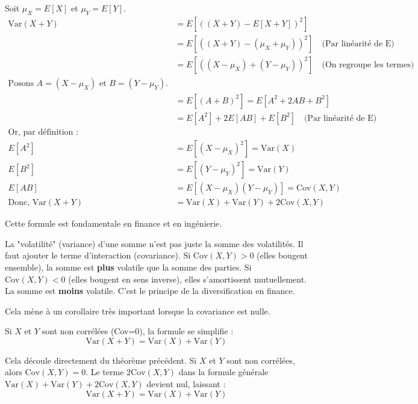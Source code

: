 \begin{proofbox}
Soit $\mu_X = E[X]$ et $\mu_Y = E[Y]$.
\begin{align*}
\text{Var}(X+Y) &= E\left[ ((X+Y) - E[X+Y])^2 \right] \\
&= E\left[ ((X+Y) - (\mu_X + \mu_Y))^2 \right] \quad \text{(Par linéarité de E)} \\
&= E\left[ ((X - \mu_X) + (Y - \mu_Y))^2 \right] \quad \text{(On regroupe les termes)} \\
\text{Posons } A = (X - \mu_X) \text{ et } B = (Y - \mu_Y). \\
&= E[ (A + B)^2 ] = E[ A^2 + 2AB + B^2 ] \\
&= E[A^2] + 2E[AB] + E[B^2] \quad \text{(Par linéarité de E)} \\
\text{Or, par définition :} \\
E[A^2] &= E[(X-\mu_X)^2] = \text{Var}(X) \\
E[B^2] &= E[(Y-\mu_Y)^2] = \text{Var}(Y) \\
E[AB] &= E[(X-\mu_X)(Y-\mu_Y)] = \text{Cov}(X,Y) \\
\text{Donc, } \text{Var}(X+Y) &= \text{Var}(X) + \text{Var}(Y) + 2\text{Cov}(X,Y)
\end{align*}
\end{proofbox}

Cette formule est fondamentale en finance et en ingénierie.

\begin{intuitionbox}
La "volatilité" (variance) d'une somme n'est pas juste la somme des volatilités. Il faut ajouter le terme d'interaction (covariance).
Si $\text{Cov}(X,Y) > 0$ (elles bougent ensemble), la somme est \textbf{plus} volatile que la somme des parties.
Si $\text{Cov}(X,Y) < 0$ (elles bougent en sens inverse), elles s'amortissent mutuellement. La somme est \textbf{moins} volatile. C'est le principe de la diversification en finance.
\end{intuitionbox}

Cela mène à un corollaire très important lorsque la covariance est nulle.

\begin{theorembox}
Si $X$ et $Y$ sont non corrélées (Cov=0), la formule se simplifie :
$$\text{Var}(X+Y) = \text{Var}(X) + \text{Var}(Y)$$
\end{theorembox}

\begin{proofbox}
Cela découle directement du théorème précédent. Si $X$ et $Y$ sont non corrélées, alors $\text{Cov}(X,Y) = 0$.
Le terme $2\text{Cov}(X,Y)$ dans la formule générale $\text{Var}(X) + \text{Var}(Y) + 2\text{Cov}(X,Y)$ devient nul, laissant :
$$\text{Var}(X+Y) = \text{Var}(X) + \text{Var}(Y)$$
\end{proofbox}

